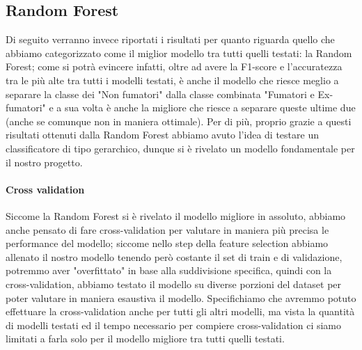 \subsection{Random Forest}

Di seguito verranno invece riportati i risultati per quanto riguarda quello che abbiamo categorizzato come il miglior modello tra tutti quelli testati: la Random Forest; come si potrà evincere infatti, oltre ad avere la F1-score e l'accuratezza tra le più alte tra tutti i modelli testati, è anche il modello che riesce meglio a separare la classe dei "Non fumatori" dalla classe combinata "Fumatori e Ex-fumatori" e a sua volta è anche la migliore che riesce a separare queste ultime due (anche se comunque non in maniera ottimale).
Per di più, proprio grazie a questi risultati ottenuti dalla Random Forest abbiamo avuto l'idea di testare un classificatore di tipo gerarchico, dunque si è rivelato un modello fondamentale per il nostro progetto.

\paragraph{Cross validation}
Siccome la Random Forest si è rivelato il modello migliore in assoluto, abbiamo anche pensato di fare cross-validation per valutare in maniera più precisa le performance del modello; siccome nello step della feature selection abbiamo allenato il nostro modello tenendo però costante il set di train e di validazione, potremmo aver "overfittato" in base alla suddivisione specifica, quindi con la cross-validation, abbiamo testato il modello su diverse porzioni del dataset per poter valutare in maniera esaustiva il modello. Specifichiamo che avremmo potuto effettuare la cross-validation anche per tutti gli altri modelli, ma vista la quantità di modelli testati ed il tempo necessario per compiere cross-validation ci siamo limitati a farla solo per il modello migliore tra tutti quelli testati.

